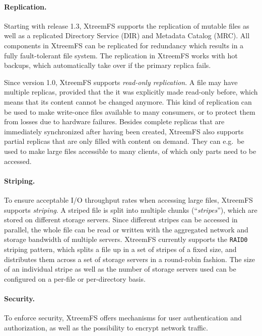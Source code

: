 \documentclass[a4paper,10pt]{book}
\begin{document}
\paragraph{Replication.}
Starting with release 1.3, XtreemFS supports the replication of mutable files as well as a replicated Directory Service (DIR) and Metadata Catalog (MRC). All components in XtreemFS can be replicated for redundancy which results in a fully fault-tolerant file system. The replication in XtreemFS works with hot backups, which automatically take over if the primary replica fails.

Since version 1.0, XtreemFS supports \emph{read-only replication}. A file may have multiple replicas, provided that the it was explicitly made read-only before, which means that its content cannot be changed anymore. This kind of replication can be used to make write-once files available to many consumers, or to protect them from losses due to hardware failures. Besides complete replicas that are immediately synchronized after having been created, XtreemFS also supports partial replicas that are only filled with content on demand. They can e.g.\ be used to make large files accessible to many clients, of which only parts need to be accessed.

\paragraph{Striping.}
To ensure acceptable I/O throughput rates when accessing large files, XtreemFS supports \emph{striping}. A striped file is split into multiple chunks (``\emph{stripes}''), which are stored on different storage servers. Since different stripes can be accessed in parallel, the whole file can be read or written with the aggregated network and storage bandwidth of multiple servers. XtreemFS currently supports the \texttt{RAID0} striping pattern, which splits a file up in a set of stripes of a fixed size, and distributes them across a set of storage servers in a round-robin fashion. The size of an individual stripe as well as the number of storage servers used can be configured on a per-file or per-directory basis.

\paragraph{Security.}
To enforce security, XtreemFS offers mechanisms for user authentication and authorization, as well as the possibility to encrypt network traffic.
\end{document}
